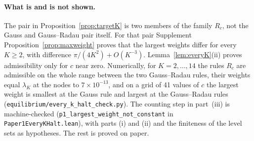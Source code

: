 \paragraph{What is and is not shown.} The pair in Proposition~\ref{prop:targetK} is two members of the family $R_c$, not the Gauss and Gauss--Radau pair itself. For that pair Supplement Proposition~\ref{prop:maxweight} proves that the largest weights differ for every $K\ge2$, with difference $\pi/(4K^2)+O(K^{-3})$. Lemma~\ref{lem:everyK}(ii) proves admissibility only for $c$ near zero. Numerically, for $K=2,\ldots,14$ the rules $R_c$ are admissible on the whole range between the two Gauss--Radau rules, their weights equal $\lambda_K$ at the nodes to $7\times10^{-13}$, and on a grid of 41 values of $c$ the largest weight is smallest at the Gauss rule and largest at the Gauss--Radau rules (\nolinkurl{equilibrium/every_k_halt_check.py}). The counting step in part~(iii) is machine-checked (\texttt{p1\_largest\_weight\_not\_constant} in \nolinkurl{Paper1EveryKHalt.lean}), with parts (i) and (ii) and the finiteness of the level sets as hypotheses. The rest is proved on paper.

